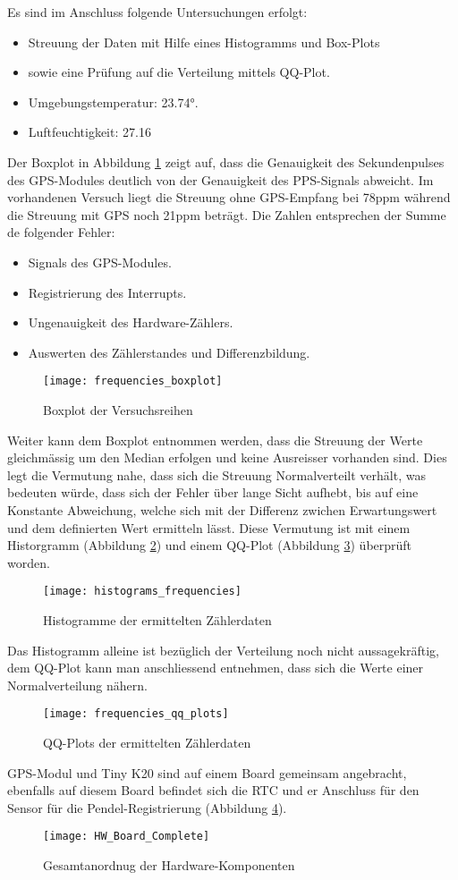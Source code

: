 Es sind im Anschluss folgende Untersuchungen erfolgt:
\begin{itemize}
	\item Streuung der Daten mit Hilfe eines Histogramms und Box-Plots
	\item sowie eine Prüfung auf die Verteilung mittels QQ-Plot.
	\item Umgebungstemperatur: 23.74°.
	\item Luftfeuchtigkeit: 27.16%
\end{itemize}
Der Boxplot in Abbildung \ref{fig:freq_boxplot} zeigt auf, dass die Genauigkeit des Sekundenpulses des GPS-Modules deutlich von der Genauigkeit des PPS-Signals abweicht. Im vorhandenen Versuch liegt die Streuung ohne GPS-Empfang bei 78ppm während die Streuung mit GPS noch 21ppm beträgt. Die Zahlen entsprechen der Summe de folgender Fehler:
\begin{itemize}
	\item Signals des GPS-Modules.
	\item Registrierung des Interrupts.
	\item Ungenauigkeit des Hardware-Zählers.
	\item Auswerten des Zählerstandes und Differenzbildung. 
\end{itemize}
	\begin{figure}[H]
		\centering
		\texttt{[image: frequencies\_boxplot]}
		\caption{Boxplot der Versuchsreihen}
		\label{fig:freq_boxplot}
	\end{figure}
%
Weiter kann dem Boxplot entnommen werden, dass die Streuung der Werte gleichmässig um den Median erfolgen und keine Ausreisser vorhanden sind. Dies legt die Vermutung nahe, dass sich die Streuung Normalverteilt verhält, was bedeuten würde, dass sich der Fehler über lange Sicht aufhebt, bis auf eine Konstante Abweichung, welche sich mit der Differenz zwichen Erwartungswert und dem definierten Wert ermitteln lässt. Diese Vermutung ist mit einem Historgramm (Abbildung \ref{fig:freq_histograms}) und einem QQ-Plot (Abbildung \ref{fig:freq_qq_plot}) überprüft worden.
	\begin{figure}[H]
		\centering
		\texttt{[image: histograms\_frequencies]}
		\caption{Histogramme der ermittelten Zählerdaten}
		\label{fig:freq_histograms}
	\end{figure}
	Das Histogramm alleine ist bezüglich der Verteilung noch nicht aussagekräftig, dem QQ-Plot kann man anschliessend entnehmen, dass sich die Werte einer Normalverteilung nähern.
	\begin{figure}[H]
		\centering
		\texttt{[image: frequencies\_qq\_plots]}
		\caption{QQ-Plots der ermittelten Zählerdaten}
		\label{fig:freq_qq_plot}
	\end{figure}
GPS-Modul und Tiny K20 sind auf einem Board gemeinsam angebracht, ebenfalls auf diesem Board befindet sich die RTC und er Anschluss für den Sensor für die Pendel-Registrierung (Abbildung \ref{fig:hardware_board}).
	\begin{figure}[H]
		\centering
		\texttt{[image: HW\_Board\_Complete]}
		\caption{Gesamtanordnug der Hardware-Komponenten}
		\label{fig:hardware_board}
	\end{figure}